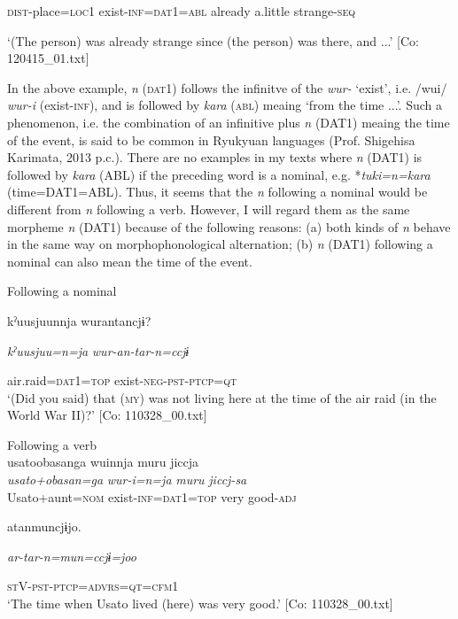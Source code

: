 \begin{table}
    \textsc{dist}-place=\textsc{loc}1  exist-\textsc{inf}=\textsc{dat}1=\textsc{abl}  already  a.little  strange-\textsc{seq}

\glt    ‘(The person) was already strange since (the person) was there, and ...’ [Co: 120415\_01.txt]
\z

In the above example, \textit{n} (\textsc{dat}1) follows the infinitve of the \textit{wur-} ‘exist’, i.e. /wui/ \textit{wur-i} (exist-\textsc{inf}), and is followed by \textit{kara} (\textsc{abl}) meaing ‘from the time ...’. Such a phenomenon, i.e. the combination of an infinitive plus \textit{n} (DAT1) meaing the time of the event, is said to be common in Ryukyuan languages (Prof. Shigehisa Karimata, 2013 p.c.). There are no examples in my texts where \textit{n} (DAT1) is followed by \textit{kara} (ABL) if the preceding word is a nominal, e.g. *\textit{tuki=n=kara} (time=DAT1=ABL). Thus, it seems that the \textit{n} following a nominal would be different from \textit{n} following a verb. However, I will regard them as the same morpheme \textit{n} (DAT1) because of the following reasons: (a) both kinds of \textit{n} behave in the same way on morphophonological alternation; (b) \textit{n} (DAT1) following a nominal can also mean the time of the event.

\ea\label{ex:6-57}
\ea Following a nominal\\
\gll

{\US}
kˀuusjuunnja  wurantancjɨ?

      \textit{kˀuusjuu=n=ja}  \textit{wur-an-tar-n=ccjɨ}

      air.raid=\textsc{dat}1=\textsc{top}  exist-\textsc{neg}-\textsc{pst}-\textsc{ptcp}=\textsc{qt}\\
\glt ‘(Did you said) that (\textsc{my}) was not living here at the time of the air raid (in the World War II)?’ [Co: 110328\_00.txt]
\z

\ex Following a verb\\
{\TM}
\glll  usato{\textbar}obasan{\textbar}ga  wuinnja  muru  jiccja\\
\textit{usato+obasan=ga}  \textit{wur-i=n=ja}  \textit{muru}  \textit{jiccj-sa}\\
Usato+aunt=\textsc{nom}  exist-\textsc{inf}=\textsc{dat}1=\textsc{top}  very  good-\textsc{adj}

      atanmuncjɨjo.

      \textit{ar-tar-n=mun=ccjɨ=joo}

      \textsc{st}V-\textsc{pst}-\textsc{ptcp}=\textsc{advrs}=\textsc{qt}=\textsc{cfm}1\\
\glt ‘The time when Usato lived (here) was very good.’ [Co: 110328\_00.txt]
\z


\end{table}
